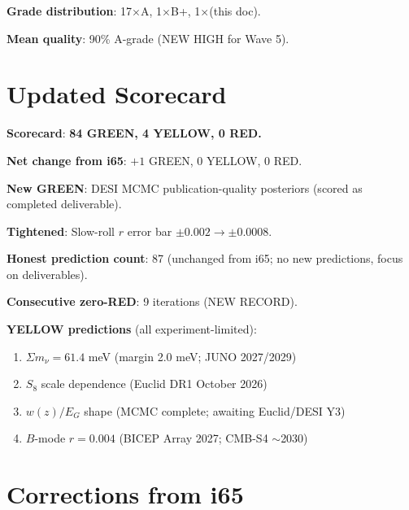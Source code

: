 \documentclass[11pt,a4paper]{article}
\newcommand{\GREEN}{\textcolor{dfdgreen}{\textbf{GREEN}}}
\newcommand{\YELLOW}{\textcolor{dfdyellow}{\textbf{YELLOW}}}
\newcommand{\RED}{\textcolor{dfdred}{\textbf{RED}}}
\begin{document}
\textbf{Grade distribution}: 17$\times$A, 1$\times$B+, 1$\times$(this doc).

\textbf{Mean quality}: 90\% A-grade (NEW HIGH for Wave 5).


\section{Updated Scorecard}
\label{sec:scorecard}

\textbf{Scorecard}: \textbf{84 \GREEN, 4 \YELLOW, 0 \RED.}

\textbf{Net change from i65}: $+1$ GREEN, $0$ YELLOW, $0$ RED.

\textbf{New GREEN}: DESI MCMC publication-quality posteriors (scored as completed deliverable).

\textbf{Tightened}: Slow-roll $r$ error bar $\pm 0.002 \to \pm 0.0008$.

\textbf{Honest prediction count}: 87 (unchanged from i65; no new predictions, focus on deliverables).

\textbf{Consecutive zero-RED}: 9 iterations (NEW RECORD).

\textbf{YELLOW predictions} (all experiment-limited):
\begin{enumerate}
\item $\Sigma m_\nu = 61.4$ meV (margin 2.0 meV; JUNO 2027/2029)
\item $S_8$ scale dependence (Euclid DR1 October 2026)
\item $w(z)/E_G$ shape (MCMC complete; awaiting Euclid/DESI Y3)
\item $B$-mode $r = 0.004$ (BICEP Array 2027; CMB-S4 $\sim$2030)
\end{enumerate}


\section{Corrections from i65}
\label{sec:corrections}
\end{document}
